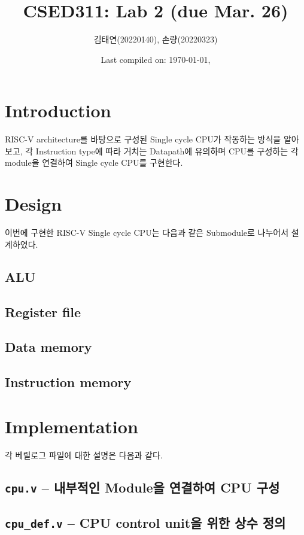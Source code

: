 \documentclass{scrartcl}
\title{CSED311: Lab 2 (due Mar. 26)}
\author{김태연(20220140), 손량(20220323)}
\date{Last compiled on: \today, \currenttime}
\begin{document}
\maketitle

\section{Introduction}
RISC-V architecture를 바탕으로 구성된 Single cycle CPU가 작동하는 방식을 알아보고,
각 Instruction type에 따라 거치는 Datapath에 유의하며 CPU를 구성하는 각 module을
연결하여 Single cycle CPU를 구현한다.

\section{Design}
이번에 구현한 RISC-V Single cycle CPU는 다음과 같은 Submodule로 나누어서 설계하였다.

\subsection{ALU}

\subsection{Register file}

\subsection{Data memory}

\subsection{Instruction memory}

\section{Implementation}

각 베릴로그 파일에 대한 설명은 다음과 같다.

\subsection{\texttt{cpu.v} -- 내부적인 Module을 연결하여 CPU 구성}

\subsection{\texttt{cpu\_def.v} -- CPU control unit을 위한 상수 정의}
\end{document}
